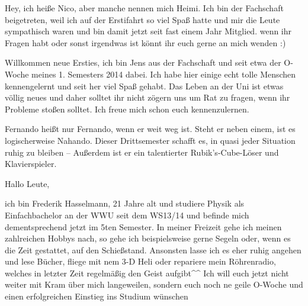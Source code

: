 \begin{multicols*}{2}
{Hey, ich heiße Nico, aber manche nennen mich Heimi. Ich bin der Fachschaft beigetreten, weil  ich auf der Erstifahrt so viel Spaß hatte und mir die Leute sympathisch waren und bin damit jetzt seit fast einem Jahr Mitglied. wenn ihr Fragen habt oder sonst irgendwas ist könnt ihr euch gerne an mich wenden :)
	\vspace{2\baselineskip}}

{Willkommen neue Ersties, ich bin Jens aus der Fachschaft und seit etwa der O-Woche meines 1. Semesters 2014 dabei. Ich habe hier einige echt tolle Menschen kennengelernt und seit her viel Spaß gehabt. Das Leben an der Uni ist etwas völlig neues und daher solltet ihr nicht zögern uns um Rat zu fragen, wenn ihr Probleme stoßen solltet. Ich freue mich schon euch kennenzulernen.
	\vspace{2\baselineskip}}

{Fernando heißt nur Fernando, wenn er weit weg ist. Steht er neben einem, ist es logischerweise Nahando. Dieser Drittsemester schafft es, in quasi jeder Situation ruhig zu bleiben -- Außerdem ist er ein talentierter Rubik's-Cube-Löser und Klavierspieler.}

{
	Hallo Leute,
	
	ich bin Frederik Hasselmann, 21 Jahre alt und studiere Physik als
	Einfachbachelor an der WWU seit dem WS13/14 und befinde mich dementsprechend
	jetzt im 5ten Semester.
	In meiner Freizeit gehe ich meinen zahlreichen Hobbys nach, so gehe ich
	beispielsweise gerne Segeln oder, wenn es die Zeit gestattet, auf den
	Schießstand. Ansonsten lasse ich es eher ruhig angehen und lese Bücher, fliege
	mit nem 3-D Heli oder repariere mein Röhrenradio, welches in letzter Zeit
	regelmäßig den Geist aufgibt\^{}\^{}
	Ich will euch jetzt nicht weiter mit Kram über mich langeweilen, sondern euch
	noch ne geile O-Woche und einen erfolgreichen Einstieg ins Studium wünschen
	
}
\end{multicols*}
